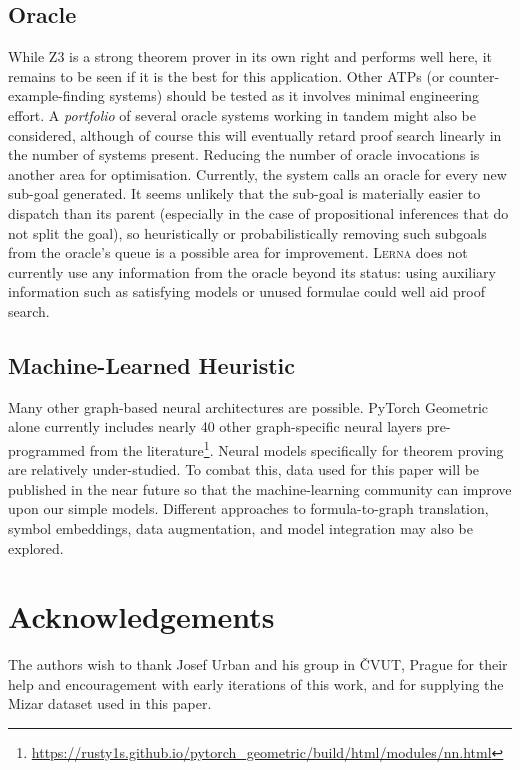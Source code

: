 \documentclass[runningheads]{llncs}
\newcommand{\lerna}{\textsc{Lerna}}
\newcommand{\z}[1]{\textsc{Z3}}
\begin{document}
\subsection{Oracle}
While \z3 is a strong theorem prover in its own right and performs well here, it remains to be seen if it is the best for this application.
Other ATPs (or counter-example-finding systems) should be tested as it involves minimal engineering effort.
A \emph{portfolio} of several oracle systems working in tandem might also be considered, although of course this will eventually retard proof search linearly in the number of systems present.
Reducing the number of oracle invocations is another area for optimisation.
Currently, the system calls an oracle for every new sub-goal generated.
It seems unlikely that the sub-goal is materially easier to dispatch than its parent (especially in the case of propositional inferences that do not split the goal), so heuristically or probabilistically removing such subgoals from the oracle's queue is a possible area for improvement.
\lerna{} does not currently use any information from the oracle beyond its status: using auxiliary information such as satisfying models or unused formulae could well aid proof search.

\subsection{Machine-Learned Heuristic}
Many other graph-based neural architectures are possible.
PyTorch Geometric alone currently includes nearly 40 other graph-specific neural layers pre-programmed from the literature\footnote{\url{https://rusty1s.github.io/pytorch_geometric/build/html/modules/nn.html}}.
Neural models specifically for theorem proving are relatively under-studied.
To combat this, data used for this paper will be published in the near future so that the machine-learning community can improve upon our simple models.
Different approaches to formula-to-graph translation, symbol embeddings, data augmentation, and model integration may also be explored.
\section{Acknowledgements}
The authors wish to thank Josef Urban and his group in \v{C}VUT, Prague for their help and encouragement with early iterations of this work, and for supplying the Mizar dataset used in this paper.
\clearpage


\end{document}
